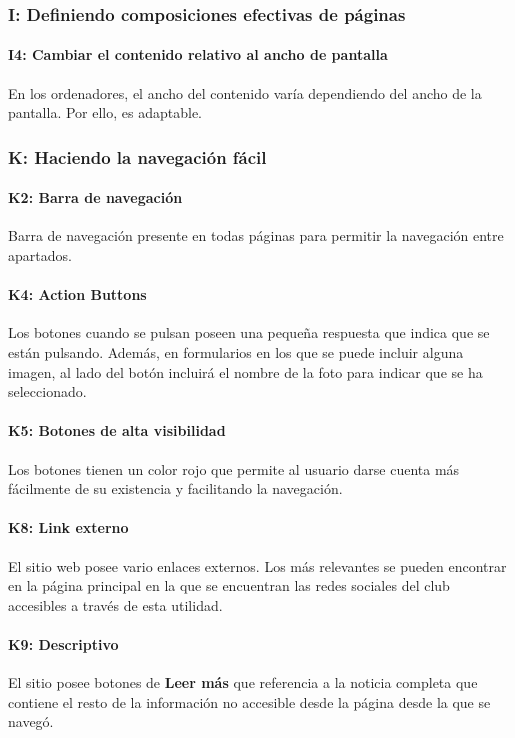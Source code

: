 \documentclass[10pt, spanish, pdftex]{template/UC3M_document}
\begin{document}
\subsubsection{I: Definiendo composiciones efectivas de páginas}
\paragraph{I4: Cambiar el contenido relativo al ancho de pantalla}
  En los ordenadores, el ancho del contenido varía dependiendo del ancho de la pantalla. Por ello, es adaptable.

\subsubsection{K: Haciendo la navegación fácil}
\paragraph{K2: Barra de navegación}
  Barra de navegación presente en todas páginas para permitir la navegación entre apartados.
\paragraph{K4: Action Buttons}
  Los botones cuando se pulsan poseen una pequeña respuesta que indica que se están pulsando. Además, en formularios en los que se puede incluir alguna imagen, al lado del botón incluirá el nombre de la foto para indicar que se ha seleccionado.
\paragraph{K5: Botones de alta visibilidad}
  Los botones tienen un color rojo que permite al usuario darse cuenta más fácilmente de su existencia y facilitando la navegación.
\paragraph{K8: Link externo}
  El sitio web posee vario enlaces externos. Los más relevantes se pueden encontrar en la página principal en la que se encuentran las redes sociales del club accesibles a través de esta utilidad.
\paragraph{K9: Descriptivo}
  El sitio posee botones de \textbf{Leer más} que referencia a la noticia completa que contiene el resto de la información no accesible desde la página desde la que se navegó.
\end{document}

